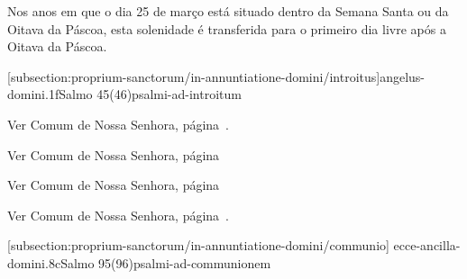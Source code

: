 \def\Prefix{subsection:proprium-sanctorum/in-annuntiatione-domini}

\begin{rubrica}
  Nos anos em que o dia 25 de março está situado dentro da Semana Santa ou da Oitava da Páscoa, esta solenidade é transferida para o primeiro dia livre após a Oitava da Páscoa.
\end{rubrica}

[\Prefix/introitus]{angelus-domini.1f}{Salmo 45(46)}{psalmi-ad-introitum}

\begin{rubrica}
  Ver Comum de Nossa Senhora, página~\pageref{subsection:communia/commune-bmv/psalmus-responsorius}.
\end{rubrica}

\begin{rubrica}
  Ver Comum de Nossa Senhora, página~\pageref{subsection:communia/commune-bmv/alleluia}
\end{rubrica}

\begin{rubrica}
  Ver Comum de Nossa Senhora, página~\pageref{subsection:communia/commune-bmv/psalmus-alleluiaticus}
\end{rubrica}

\begin{rubrica}
  Ver Comum de Nossa Senhora, página~\pageref{subsection:communia/commune-bmv/offertorium}.
\end{rubrica}

\AllowPageFlush

[\Prefix/communio]
{ecce-ancilla-domini.8c}{Salmo 95(96)}{psalmi-ad-communionem}

\AllowPageFlush
